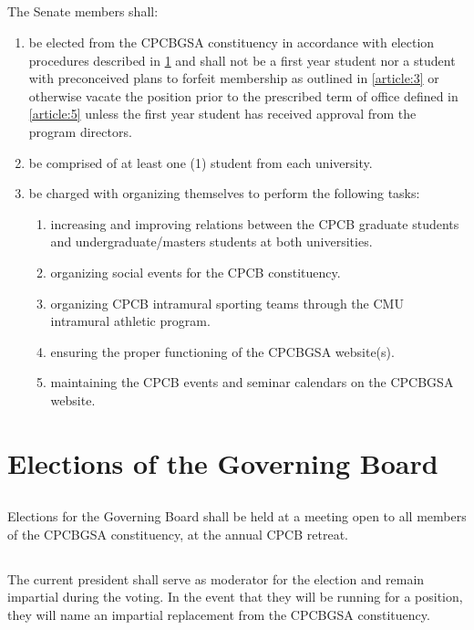\documentclass[11pt,a4paper]{article}
\begin{document}
\subsection{}The Senate members shall:
\begin{enumerate}        
	\item be elected from the CPCBGSA constituency in accordance with election procedures described in \cref{article:7} and shall not be a first year student nor a student with preconceived plans to forfeit membership as outlined in \cref{article:3} or otherwise vacate the position prior to the prescribed term of office defined in \cref{article:5} unless the first year student has received approval from the program directors.
	\item be comprised of at least one (1) student from each university.
	\item be charged with organizing themselves to perform the following tasks:
	\begin{enumerate}        
		\item increasing and improving relations between the CPCB graduate students and undergraduate/masters students at both universities.
		\item organizing social events for the CPCB constituency.
		\item organizing CPCB intramural sporting teams through the CMU intramural athletic program.
		\item ensuring the proper functioning of the CPCBGSA website(s).
		\item maintaining the CPCB events and seminar calendars on the CPCBGSA website.
	\end{enumerate}        
\end{enumerate}        

\section{Elections of the Governing Board}\label{article:7}

\subsection{}Elections for the Governing Board shall be held at a meeting open to all members of the CPCBGSA constituency, at the annual CPCB retreat.

\subsection{}The current president shall serve as moderator for the election and remain impartial during the voting.  In the event that they will be running for a position, they will name an impartial replacement from the CPCBGSA constituency.
 
\end{document}
